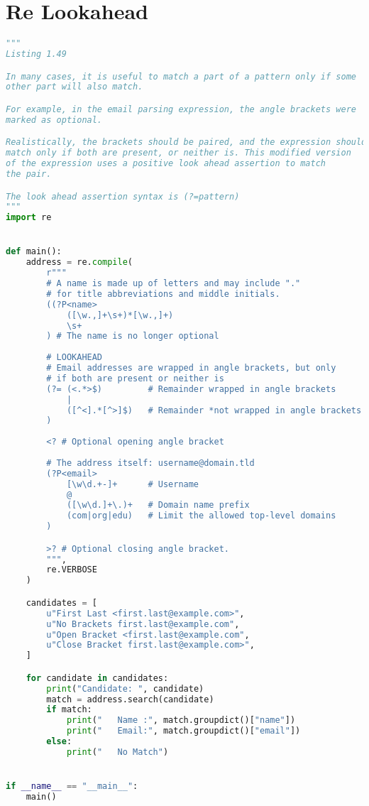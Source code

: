 \documentclass[a4paper,landscape]{report}
\begin{document}
\section{Re Lookahead}
\begin{lstlisting}[language=Python]
"""
Listing 1.49

In many cases, it is useful to match a part of a pattern only if some
other part will also match.

For example, in the email parsing expression, the angle brackets were
marked as optional.

Realistically, the brackets should be paired, and the expression should
match only if both are present, or neither is. This modified version
of the expression uses a positive look ahead assertion to match
the pair.

The look ahead assertion syntax is (?=pattern)
"""
import re


def main():
    address = re.compile(
        r"""
        # A name is made up of letters and may include "."
        # for title abbreviations and middle initials.
        ((?P<name>
            ([\w.,]+\s+)*[\w.,]+)
            \s+
        ) # The name is no longer optional
        
        # LOOKAHEAD
        # Email addresses are wrapped in angle brackets, but only
        # if both are present or neither is
        (?= (<.*>$)         # Remainder wrapped in angle brackets
            |
            ([^<].*[^>]$)   # Remainder *not wrapped in angle brackets 
        )
        
        <? # Optional opening angle bracket
        
        # The address itself: username@domain.tld
        (?P<email>
            [\w\d.+-]+      # Username
            @
            ([\w\d.]+\.)+   # Domain name prefix
            (com|org|edu)   # Limit the allowed top-level domains
        )

        >? # Optional closing angle bracket.
        """,
        re.VERBOSE
    )

    candidates = [
        u"First Last <first.last@example.com>",
        u"No Brackets first.last@example.com",
        u"Open Bracket <first.last@example.com",
        u"Close Bracket first.last@example.com>",
    ]

    for candidate in candidates:
        print("Candidate: ", candidate)
        match = address.search(candidate)
        if match:
            print("   Name :", match.groupdict()["name"])
            print("   Email:", match.groupdict()["email"])
        else:
            print("   No Match")


if __name__ == "__main__":
    main()

\end{lstlisting}
\end{document}
